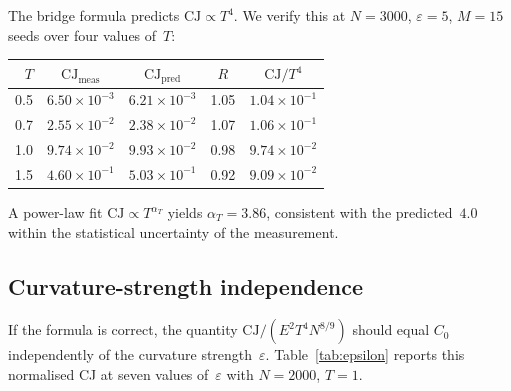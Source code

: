 \documentclass[12pt,a4paper]{article}
\theoremstyle{plain}
\theoremstyle{definition}
\theoremstyle{remark}
\newcommand{\CJ}{\mathrm{CJ}}
\begin{document}
The bridge formula predicts $\CJ \propto T^4$.  We verify this at
$N = 3000$, $\varepsilon = 5$, $M = 15$ seeds over four values
of~$T$:

\begin{center}
\begin{tabular}{rcccc}
\toprule
$T$ & $\CJ_{\mathrm{meas}}$ & $\CJ_{\mathrm{pred}}$
    & $R$ & $\CJ/T^4$ \\
\midrule
0.5 & $6.50 \times 10^{-3}$ & $6.21 \times 10^{-3}$ & 1.05 & $1.04 \times 10^{-1}$ \\
0.7 & $2.55 \times 10^{-2}$ & $2.38 \times 10^{-2}$ & 1.07 & $1.06 \times 10^{-1}$ \\
1.0 & $9.74 \times 10^{-2}$ & $9.93 \times 10^{-2}$ & 0.98 & $9.74 \times 10^{-2}$ \\
1.5 & $4.60 \times 10^{-1}$ & $5.03 \times 10^{-1}$ & 0.92 & $9.09 \times 10^{-2}$ \\
\bottomrule
\end{tabular}
\end{center}

A power-law fit $\CJ \propto T^{\alpha_T}$ yields
$\alpha_T = 3.86$, consistent with the predicted~$4.0$ within the
statistical uncertainty of the measurement.

\subsection{Curvature-strength independence}
\label{sec:epsilon}

If the formula is correct, the quantity
$\CJ / (E^2 T^4 N^{8/9})$ should equal $C_0$ independently of the
curvature strength~$\varepsilon$.  Table~\ref{tab:epsilon} reports
this normalised CJ at seven values of~$\varepsilon$ with $N = 2000$,
$T = 1$.
\end{document}
